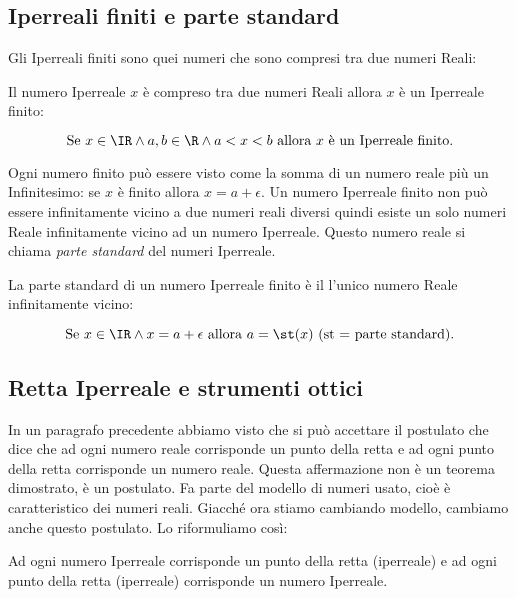 \subsection{Iperreali finiti e parte standard}
\label{subsec:insnum_partestandard}

Gli Iperreali finiti sono quei numeri che sono compresi tra due numeri Reali:

\begin{definizione}
 Il numero Iperreale $x$ è compreso tra due numeri Reali allora $x$ è un 
Iperreale finito:

\[\text{Se } x \in \IR \wedge a, b \in \R \wedge 
  a < x < b \text{ allora } x \text{ è un Iperreale finito.}\]
\end{definizione}

Ogni numero finito può essere visto come la somma di un numero reale più un 
Infinitesimo: se $x$ è finito allora $x = a + \epsilon$. Un numero Iperreale 
finito non può essere infinitamente vicino a due numeri reali diversi quindi 
esiste un solo numeri Reale infinitamente vicino ad un numero Iperreale. 
Questo numero reale si chiama \emph{parte standard} del numeri Iperreale.

\begin{definizione}
 La parte standard di un numero Iperreale finito è il l'unico numero Reale 
infinitamente vicino:

\[\text{Se } x \in \IR \wedge x= a+\epsilon \text{ allora } 
a= \st(x) \text{ (st = parte standard).}\]
\end{definizione}


\subsection{Retta Iperreale e strumenti ottici}
\label{subsec:insnum_retta}

In un paragrafo precedente abbiamo visto che si può accettare il postulato che 
dice che ad ogni numero reale corrisponde un punto della retta e ad ogni 
punto della retta corrisponde un numero reale. 
Questa affermazione non è un teorema dimostrato, è un postulato. Fa parte del modello
di numeri usato, cioè è caratteristico dei numeri reali. Giacché ora stiamo cambiando
modello, cambiamo anche questo postulato. Lo riformuliamo così:

\begin{postulato}
Ad ogni numero Iperreale corrisponde un punto della retta (iperreale) e ad ogni 
punto della retta (iperreale) corrisponde un numero Iperreale.
\end{postulato}

